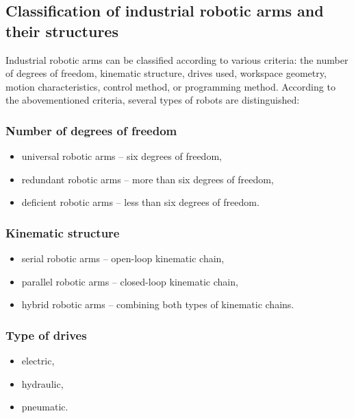 
\subsection{Classification of industrial robotic arms and their structures}

Industrial robotic arms can be classified according to various criteria: the number of degrees of freedom, kinematic structure, drives used, workspace geometry, motion characteristics, control method, or programming method. According to the abovementioned criteria, several types of robots are distinguished:

\subsubsection*{Number of degrees of freedom}

\begin{itemize}
    \item universal robotic arms -- six degrees of freedom,
    \item redundant robotic arms -- more than six degrees of freedom,
    \item deficient robotic arms -- less than six degrees of freedom.
\end{itemize}

\subsubsection*{Kinematic structure}

\begin{itemize}
    \item serial robotic arms -- open-loop kinematic chain,
    \item parallel robotic arms -- closed-loop kinematic chain,
    \item hybrid robotic arms -- combining both types of kinematic chains.
\end{itemize}


\subsubsection*{Type of drives}

\begin{itemize}
    \item electric,
    \item hydraulic,
    \item pneumatic.
\end{itemize}

